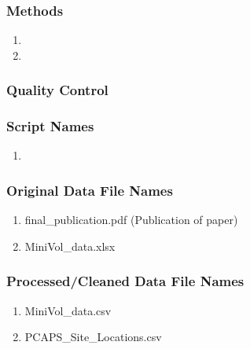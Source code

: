 \subsubsection*{Methods}

\begin{enumerate}
\item 
\item
\end{enumerate}

\subsubsection*{Quality Control}

\subsubsection*{Script Names}

\begin{enumerate}
\item 
\end{enumerate}

\subsubsection*{Original Data File Names}

\begin{enumerate}
\item final\_publication.pdf (Publication of paper)

\item MiniVol\_data.xlsx

\end{enumerate}

\subsubsection*{Processed/Cleaned Data File Names}

\begin{enumerate}
\item MiniVol\_data.csv
\item PCAPS\_Site\_Locations.csv
\end{enumerate}